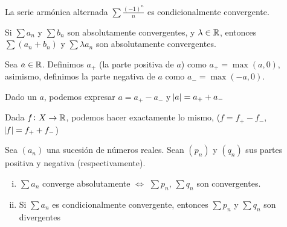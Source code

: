 \begin{example*}
  La serie armónica alternada $\sum \frac{(-1)^n}{n}$ es condicionalmente convergente.
\end{example*}

\begin{prop}
	Si $\sum a_n$ y $\sum b_n$ son absolutamente convergentes, y $\lambda \in \mathbb{R}$,
	entonces $\sum (a_n + b_n)$ y $\sum \lambda a_n$ son absolutamente convergentes.
\end{prop}

\begin{defi}
  Sea $a \in \mathbb{R}$. Definimos $a_+$ (la parte positiva de $a$) como $a_+ = \max(a, 0)$, asimismo, definimos
  la parte negativa de $a$ como $a_- = \max(-a,0)$.
\end{defi}

\begin{obs*}
  Dado un $a$, podemos expresar $a = a_+ - a_-$ y $\abs{a} = a_+ + a_-$
\end{obs*}

\begin{obs*}
  Dada $f \colon X \to \mathbb{R}$, podemos hacer exactamente lo mismo, ($f = f_+ - f_-$, $\abs{f} = f_+ + f_-$)
\end{obs*}

\begin{example*} \hspace{0pt}
  \begin{center}
  \end{center}

\end{example*}

\begin{lema}
  Sea $(a_n)$ una sucesión de números reales. Sean $(p_n)$ y $(q_n)$ sus partes positiva y negativa
  (respectivamente).
  \begin{enumerate}[i)]
    \item \label{item:abs_conv_conv}
			$\sum a_n$ converge absolutamente $\iff$ $\sum p_n$, $\sum q_n$ son convergentes.
    \item Si $\sum a_n$ es condicionalmente convergente, entonces $\sum p_n$ y $\sum q_n$ son divergentes
  \end{enumerate}
\end{lema}


